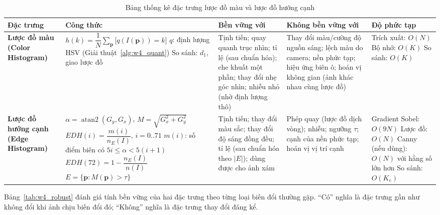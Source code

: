 \begin{table}[ht]
\centering
\scriptsize
\setlength{\tabcolsep}{3pt}
\caption{Bảng thống kê đặc trưng lược đồ màu và lược đồ hướng cạnh}
\label{tab:w4_features}
\renewcommand{\arraystretch}{1.35}
\begin{tabularx}{\textwidth}{|p{1.6cm}|p{3.3cm}|X|X|p{2.2cm}|}
\hline
\textbf{Đặc trưng} & \textbf{Công thức} & \textbf{Bền vững với} & \textbf{Không bền vững với} & \textbf{Độ phức tạp} \\
\hline
\textbf{Lược đồ màu (Color Histogram)} &
$h(k) = \dfrac{1}{N} \displaystyle\sum_{\mathbf{p}} \big[q(I(\mathbf{p})) = k\big]$ \newline
$q$: định lượng HSV (Giải thuật~\ref{alg:w4_quant}) \newline
So sánh: $d_1$, giao lược đồ &
Tịnh tiến; quay quanh trục nhìn; tỉ lệ (sau chuẩn hóa); che khuất một phần; thay đổi nhẹ góc nhìn; nhiễu nhỏ (nhờ định lượng thô) &
Thay đổi màu/cường độ nguồn sáng; lệch màu do camera; nền phức tạp; hiệu ứng biên ô; hoán vị không gian (ảnh khác nhau cùng lược đồ) &
Trích xuất: $O(N)$ \newline
Bộ nhớ: $O(K)$ \newline
So sánh: $O(K)$ \\
\hline
\textbf{Lược đồ hướng cạnh (Edge Histogram)} &
$\alpha = \operatorname{atan2}(G_y, G_x)$, \newline $M = \sqrt{G_x^2 + G_y^2}$ \newline
$EDH(i) = \dfrac{m(i)}{n_E(I)}$, $i = 0..71$ \newline $m(i)$: số điểm biên có $5i \le \alpha < 5(i{+}1)$ \newline $EDH(72) = 1 - \dfrac{n_E(I)}{n(I)}$ \newline
$E = \{\mathbf{p} : M(\mathbf{p}) > \tau\}$ &
Tịnh tiến; thay đổi màu sắc; thay đổi độ sáng đồng đều; tỉ lệ (sau chuẩn hóa theo $|E|$); dùng được cho ảnh xám &
Phép quay (lược đồ dịch vòng); nhiễu; ngưỡng $\tau$; cạnh của nền phức tạp; hoán vị vị trí cạnh &
Gradient Sobel: $O(9N)$ \newline
Lược đồ: $O(N)$ \newline
Canny (nếu dùng): $O(N)$ với hằng số lớn hơn \newline
So sánh: $O(K_e)$ \\
\hline
\end{tabularx}
\end{table}

Bảng~\ref{tab:w4_robust} đánh giá tính bền vững của hai đặc trưng theo từng loại biến đổi thường gặp. ``Có'' nghĩa là đặc trưng gần như không đổi khi ảnh chịu biến đổi đó; ``Không'' nghĩa là đặc trưng thay đổi đáng kể.

